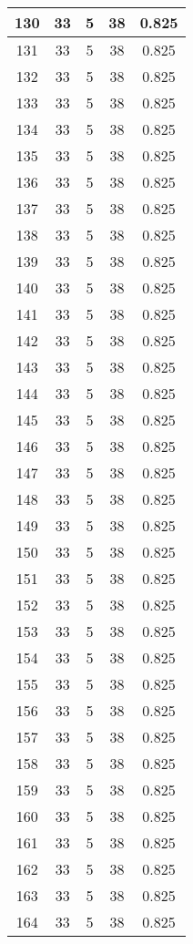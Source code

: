 \documentclass[letterpaper, 12pt]{article}
\begin{document}
\begin{longtable}{|c|c|c|c|c|}
\hline
130 & 33 & 5 & 38 & 0.825 \\
\hline
131 & 33 & 5 & 38 & 0.825 \\
\hline
132 & 33 & 5 & 38 & 0.825 \\
\hline
133 & 33 & 5 & 38 & 0.825 \\
\hline
134 & 33 & 5 & 38 & 0.825 \\
\hline
135 & 33 & 5 & 38 & 0.825 \\
\hline
136 & 33 & 5 & 38 & 0.825 \\
\hline
137 & 33 & 5 & 38 & 0.825 \\
\hline
138 & 33 & 5 & 38 & 0.825 \\
\hline
139 & 33 & 5 & 38 & 0.825 \\
\hline
140 & 33 & 5 & 38 & 0.825 \\
\hline
141 & 33 & 5 & 38 & 0.825 \\
\hline
142 & 33 & 5 & 38 & 0.825 \\
\hline
143 & 33 & 5 & 38 & 0.825 \\
\hline
144 & 33 & 5 & 38 & 0.825 \\
\hline
145 & 33 & 5 & 38 & 0.825 \\
\hline
146 & 33 & 5 & 38 & 0.825 \\
\hline
147 & 33 & 5 & 38 & 0.825 \\
\hline
148 & 33 & 5 & 38 & 0.825 \\
\hline
149 & 33 & 5 & 38 & 0.825 \\
\hline
150 & 33 & 5 & 38 & 0.825 \\
\hline
151 & 33 & 5 & 38 & 0.825 \\
\hline
152 & 33 & 5 & 38 & 0.825 \\
\hline
153 & 33 & 5 & 38 & 0.825 \\
\hline
154 & 33 & 5 & 38 & 0.825 \\
\hline
155 & 33 & 5 & 38 & 0.825 \\
\hline
156 & 33 & 5 & 38 & 0.825 \\
\hline
157 & 33 & 5 & 38 & 0.825 \\
\hline
158 & 33 & 5 & 38 & 0.825 \\
\hline
159 & 33 & 5 & 38 & 0.825 \\
\hline
160 & 33 & 5 & 38 & 0.825 \\
\hline
161 & 33 & 5 & 38 & 0.825 \\
\hline
162 & 33 & 5 & 38 & 0.825 \\
\hline
163 & 33 & 5 & 38 & 0.825 \\
\hline
164 & 33 & 5 & 38 & 0.825 \\

\end{longtable}
\end{document}
